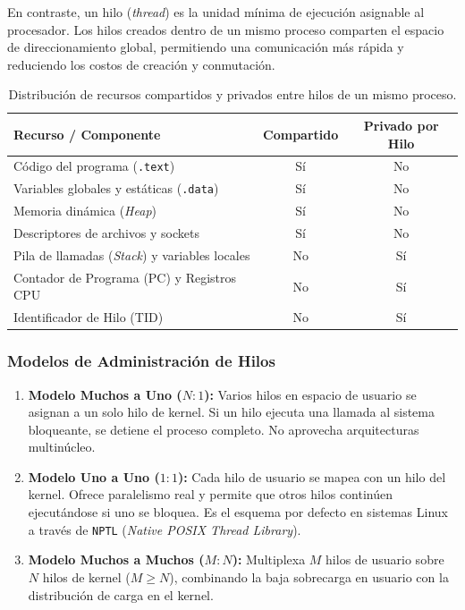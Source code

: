 \documentclass{article}
\begin{document}
En contraste, un hilo (\textit{thread}) es la unidad mínima de ejecución asignable al procesador. Los hilos creados dentro de un mismo proceso comparten el espacio de direccionamiento global, permitiendo una comunicación más rápida y reduciendo los costos de creación y conmutación.

\begin{table}[H]
    \centering
    \begin{tabular}{|l|c|c|}
    \hline
    \textbf{Recurso / Componente} & \textbf{Compartido} & \textbf{Privado por Hilo} \\ \hline
    Código del programa (\texttt{.text}) & Sí & No \\ \hline
    Variables globales y estáticas (\texttt{.data}) & Sí & No \\ \hline
    Memoria dinámica (\textit{Heap}) & Sí & No \\ \hline
    Descriptores de archivos y sockets & Sí & No \\ \hline
    Pila de llamadas (\textit{Stack}) y variables locales & No & Sí \\ \hline
    Contador de Programa (PC) y Registros CPU & No & Sí \\ \hline
    Identificador de Hilo (TID) & No & Sí \\ \hline
    \end{tabular}
    \caption{Distribución de recursos compartidos y privados entre hilos de un mismo proceso.}
    \label{tab:recursos_hilos}
\end{table}

\subsubsection*{Modelos de Administración de Hilos}
\begin{enumerate}
    \item \textbf{Modelo Muchos a Uno (\(N:1\)):} Varios hilos en espacio de usuario se asignan a un solo hilo de kernel. Si un hilo ejecuta una llamada al sistema bloqueante, se detiene el proceso completo. No aprovecha arquitecturas multinúcleo.
    \item \textbf{Modelo Uno a Uno ($1:1$):} Cada hilo de usuario se mapea con un hilo del kernel. Ofrece paralelismo real y permite que otros hilos continúen ejecutándose si uno se bloquea. Es el esquema por defecto en sistemas Linux a través de \texttt{NPTL} (\textit{Native POSIX Thread Library}).
    \item \textbf{Modelo Muchos a Muchos (\(M:N\)):} Multiplexa \(M\) hilos de usuario sobre \(N\) hilos de kernel (\(M \ge N\)), combinando la baja sobrecarga en usuario con la distribución de carga en el kernel.
\end{enumerate}
\end{document}

